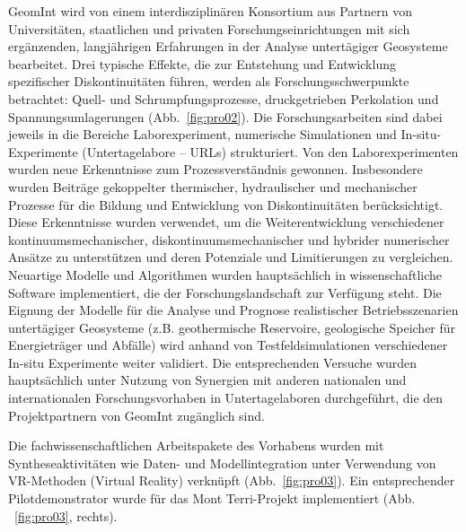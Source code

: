 GeomInt wird von einem interdisziplinären Konsortium aus Partnern von Universitäten, staatlichen und privaten Forschungseinrichtungen mit sich ergänzenden, langjährigen Erfahrungen in der Analyse untertägiger Geosysteme bearbeitet. Drei typische Effekte, die zur Entstehung und Entwicklung spezifischer Diskontinuitäten führen, werden als Forschungsschwerpunkte betrachtet: Quell- und Schrumpfungsprozesse, druckgetrieben Perkolation und Spannungsumlagerungen (Abb.~\ref{fig:pro02}). 
Die Forschungsarbeiten sind dabei jeweils in die Bereiche Laborexperiment, numerische Simulationen und In-situ-Experimente (Untertagelabore – URLs) strukturiert. Von den Laborexperimenten wurden neue Erkenntnisse zum Prozessverständnis gewonnen. Insbesondere wurden Beiträge gekoppelter thermischer, hydraulischer und mechanischer Prozesse für die Bildung und Entwicklung von Diskontinuitäten berücksichtigt. Diese Erkenntnisse wurden verwendet, um die Weiterentwicklung verschiedener kontinuumsmechanischer, diskontinuumsmechanischer und hybrider numerischer Ansätze zu unterstützen und deren Potenziale und Limitierungen zu vergleichen. Neuartige Modelle und Algorithmen wurden hauptsächlich in wissenschaftliche Software implementiert, die der Forschungslandschaft zur Verfügung steht. Die Eignung der Modelle für die Analyse und Prognose realistischer Betriebsszenarien untertägiger Geosysteme (z.B. geothermische Reservoire, geologische Speicher für Energieträger und Abfälle) wird anhand von Testfeldsimulationen verschiedener In-situ Experimente weiter validiert. Die entsprechenden Versuche  wurden hauptsächlich unter Nutzung von Synergien mit anderen nationalen und internationalen Forschungsvorhaben in Untertagelaboren durchgeführt, die den Projektpartnern von GeomInt zugänglich sind.

Die fachwissenschaftlichen Arbeitspakete des Vorhabens wurden mit Syntheseaktivitäten wie Daten- und Modellintegration unter Verwendung von VR-Methoden (Virtual Reality) verknüpft (Abb.~\ref{fig:pro03}).
Ein entsprechender Pilotdemonstrator wurde für das Mont Terri-Projekt implementiert (Abb. ~\ref{fig:pro03}, rechts).


